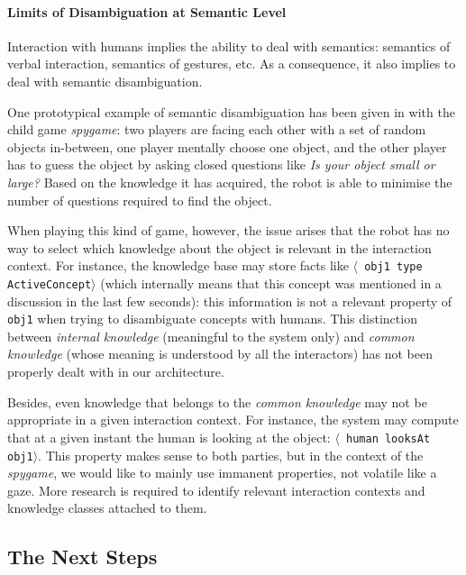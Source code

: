 \documentclass[preprint,3p,times]{elsarticle}
\newcommand{\concept}[1]{{\small \texttt{#1}}}
\newcommand{\stmt}[1]{{\footnotesize \tt $\langle$ #1\relax$\rangle$}}
\begin{document}
\paragraph{Limits of Disambiguation at Semantic Level}

Interaction with humans implies the ability to deal with semantics: semantics of
verbal interaction, semantics of gestures, etc.  As a consequence, it also
implies to deal with semantic disambiguation.

One prototypical example of semantic disambiguation has been given in
\cite{Ros2010b} with the child game \emph{spygame}: two players are facing
each other with a set of random objects in-between, one player mentally choose
one object, and the other player has to guess the object by asking closed
questions like \emph{Is your object small or large?} Based on the knowledge it
has acquired, the robot is able to minimise the number of questions required to
find the object.

When playing this kind of game, however, the issue arises that the robot has no
way to select which knowledge about the object is relevant in the interaction
context. For instance, the knowledge base may store facts like \stmt{obj1 type
ActiveConcept} (which internally means that this concept was mentioned in a
discussion in the last few seconds): this information is not a relevant
property of \concept{obj1} when trying to disambiguate concepts with humans.
This distinction between \emph{internal knowledge} (meaningful to
the system only) and \emph{common knowledge} (whose meaning is understood by
all the interactors) has not been properly dealt with in our architecture.

Besides, even knowledge that belongs to the \emph{common knowledge} may not be
appropriate in a given interaction context. For instance, the system may
compute that at a given instant the human is looking at the object: \stmt{human
looksAt obj1}. This property makes sense to both parties, but in the context of
the \emph{spygame}, we would like to mainly use immanent properties, not
volatile like a gaze. More research is required to identify relevant
interaction contexts and knowledge classes attached to them.

\subsection{The Next Steps}

\end{document}
